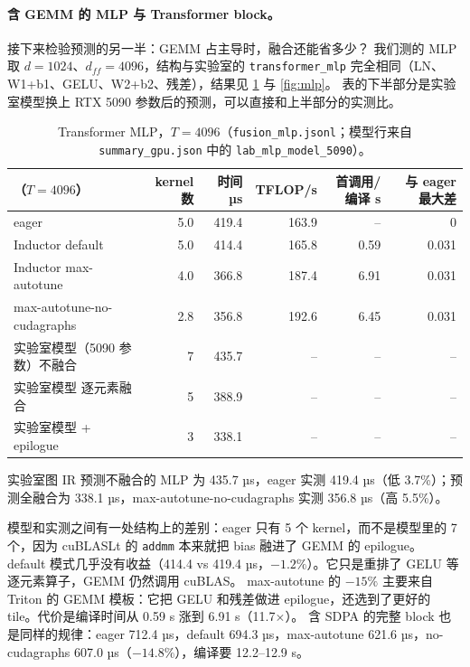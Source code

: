 \documentclass[11pt,a4paper]{ctexart}
\begin{document}
\paragraph{含 GEMM 的 MLP 与 Transformer block。}接下来检验预测的另一半：GEMM 占主导时，融合还能省多少？
我们测的 MLP 取 $d{=}1024$、$d_{ff}{=}4096$，结构与实验室的 \texttt{transformer\_mlp} 完全相同（LN、W1+b1、GELU、W2+b2、残差），结果见 \cref{tab:mlp} 与 \cref{fig:mlp}。
表的下半部分是实验室模型换上 RTX 5090 参数后的预测，可以直接和上半部分的实测比。

\begin{table}[H]
\centering\small
\begin{tabular}{lrrrrr}
\toprule
（$T{=}4096$） & kernel 数 & 时间 µs & TFLOP/s & 首调用/编译 s & 与 eager 最大差 \\
\midrule
eager & 5.0 & 419.4 & 163.9 & -- & 0 \\
Inductor default & 5.0 & 414.4 & 165.8 & 0.59 & 0.031 \\
Inductor max-autotune & 4.0 & 366.8 & 187.4 & 6.91 & 0.031 \\
max-autotune-no-cudagraphs & 2.8 & 356.8 & 192.6 & 6.45 & 0.031 \\
\midrule
实验室模型（5090 参数）不融合 & 7 & 435.7 & -- & -- & -- \\
实验室模型 逐元素融合 & 5 & 388.9 & -- & -- & -- \\
实验室模型 + epilogue & 3 & 338.1 & -- & -- & -- \\
\bottomrule
\end{tabular}
\caption{Transformer MLP，$T{=}4096$（\texttt{fusion\_mlp.jsonl}；模型行来自 \texttt{summary\_gpu.json} 中的 \texttt{lab\_mlp\_model\_5090}）。}
\label{tab:mlp}
\end{table}

\begin{findingbox}
实验室图 IR 预测不融合的 MLP 为 435.7 µs，eager 实测 419.4 µs（低 3.7\%）；预测全融合为 338.1 µs，max-autotune-no-cudagraphs 实测 356.8 µs（高 5.5\%）。
\end{findingbox}

模型和实测之间有一处结构上的差别：eager 只有 5 个 kernel，而不是模型里的 7 个，因为 cuBLASLt 的 \texttt{addmm} 本来就把 bias 融进了 GEMM 的 epilogue。
default 模式几乎没有收益（414.4 vs 419.4 µs，$-1.2\%$）。它只是重排了 GELU 等逐元素算子，GEMM 仍然调用 cuBLAS。
max-autotune 的 $-15\%$ 主要来自 Triton 的 GEMM 模板：它把 GELU 和残差做进 epilogue，还选到了更好的 tile。代价是编译时间从 0.59 s 涨到 6.91 s（11.7$\times$）。
含 SDPA 的完整 block 也是同样的规律：eager 712.4 µs，default 694.3 µs，max-autotune 621.6 µs，no-cudagraphs 607.0 µs（$-14.8\%$），编译要 12.2--12.9 s。
\end{document}
